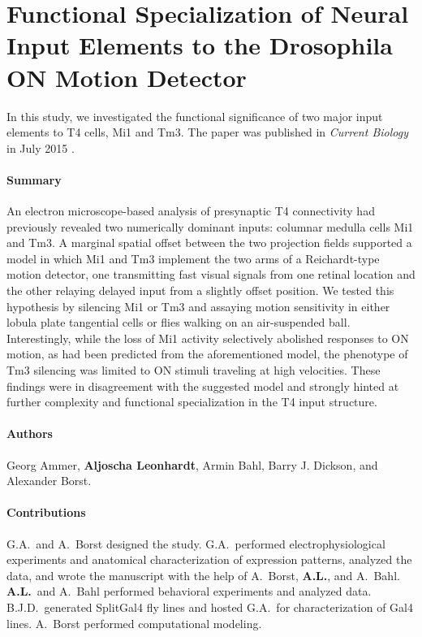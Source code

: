 \section[Functional Specialization of Neural Input Elements to the \textit{Drosophila} ON Motion Detector]{Functional Specialization of Neural Input Elements to the Drosophila ON Motion Detector}
\label{sct:manuscript_ammer}

In this study, we investigated the functional significance of two major input elements to T4 cells, Mi1 and Tm3. The paper was published in \textit{Current Biology} in July 2015 \citep{Ammer:2015jo}.

\paragraph{Summary}
An electron microscope-based analysis of presynaptic T4 connectivity had previously revealed two numerically dominant inputs: columnar medulla cells Mi1 and Tm3. A marginal spatial offset between the two projection fields supported a model in which Mi1 and Tm3 implement the two arms of a Reichardt-type motion detector, one transmitting fast visual signals from one retinal location and the other relaying delayed input from a slightly offset position. We tested this hypothesis by silencing Mi1 or Tm3 and assaying motion sensitivity in either lobula plate tangential cells or flies walking on an air-suspended ball. Interestingly, while the loss of Mi1 activity selectively abolished responses to ON motion, as had been predicted from the aforementioned model, the phenotype of Tm3 silencing was limited to ON stimuli traveling at high velocities. These findings were in disagreement with the suggested model and strongly hinted at further complexity and functional specialization in the T4 input structure.

\paragraph{Authors} Georg Ammer, \textbf{Aljoscha Leonhardt}, Armin Bahl, Barry J. Dickson, and Alexander Borst.

\paragraph{Contributions}
G.A.\ and A.\ Borst designed the study. G.A.\ performed electrophysiological experiments and anatomical characterization of expression patterns, analyzed the data, and wrote the manuscript with the help of A.\ Borst, \textbf{A.L.}, and A.\ Bahl. \textbf{A.L.}\ and A.\ Bahl performed behavioral experiments and analyzed data. B.J.D.\ generated SplitGal4 fly lines and hosted G.A.\ for characterization of Gal4 lines. A.\ Borst performed computational modeling.

\cleardoublepage

